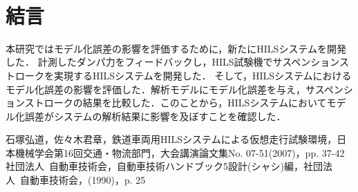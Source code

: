 \documentclass{article_vdlab_sotsuron_youshi}
\begin{document}
% 
%       

　
\section{結言}
本研究ではモデル化誤差の影響を評価するために，新たにHILSシステムを開発した．
計測したダンパ力をフィードバックし，HILS試験機でサスペンションストロークを実現するHILSシステムを開発した．
そして，HILSシステムにおけるモデル化誤差の影響を評価した．解析モデルにモデル化誤差を与え，サスペンションストロークの結果を比較した．このことから，HILSシステムにおいてモデル化誤差がシステムの解析結果に影響を及ぼすことを確認した．

\vspace{2mm}
\begin{thebibliography}{9}
石塚弘道，佐々木君章，鉄道車両用HILSシステムによる仮想走行試験環境，日本機械学会第16回交通・物流部門，大会講演論文集No. 07-51(2007)，pp. 37-42
社団法人\ 自動車技術会，自動車技術ハンドブック5設計(シャシ)編，社団法人\ 自動車技術会，(1990)，p. 25
\end{thebibliography}
\end{document}
